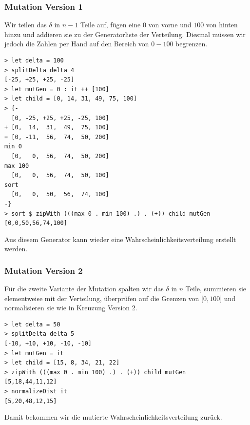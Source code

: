             \subsubsection*{Mutation Version 1}
            Wir teilen das $\delta$ in $n-1$ Teile auf, fügen eine $0$ von vorne und $100$ von hinten hinzu und addieren sie zu der Generatorliste der Verteilung. Diesmal müssen wir jedoch die Zahlen per Hand auf den Bereich von $0 - 100$ begrenzen.
            \begin{mdframed}
            \begin{verbatim}
> let delta = 100
> splitDelta delta 4
[-25, +25, +25, -25]
> let mutGen = 0 : it ++ [100]
> let child = [0, 14, 31, 49, 75, 100]
> {-
  [0, -25, +25, +25, -25, 100]
+ [0,  14,  31,  49,  75, 100]
= [0, -11,  56,  74,  50, 200]
min 0
  [0,   0,  56,  74,  50, 200]
max 100
  [0,   0,  56,  74,  50, 100]
sort
  [0,   0,  50,  56,  74, 100]
-}
> sort $ zipWith (((max 0 . min 100) .) . (+)) child mutGen
[0,0,50,56,74,100]
            \end{verbatim}
            \end{mdframed}
            Aus diesem Generator kann wieder eine Wahrscheinlichkeitsverteilung erstellt werden.

            \subsubsection*{Mutation Version 2}
            Für die zweite Variante der Mutation spalten wir das $\delta$ in $n$ Teile, summieren sie elementweise mit der Verteilung, überprüfen auf die Grenzen von [$0,100$] und normalisieren sie wie in Kreuzung Version 2.
            \begin{mdframed}
            \begin{verbatim}
> let delta = 50
> splitDelta delta 5
[-10, +10, +10, -10, -10]
> let mutGen = it
> let child = [15, 8, 34, 21, 22]
> zipWith (((max 0 . min 100) .) . (+)) child mutGen
[5,18,44,11,12]
> normalizeDist it
[5,20,48,12,15]
            \end{verbatim}
            \end{mdframed}
            Damit bekommen wir die mutierte Wahrscheinlichkeitsverteilung zurück.

\newpage

